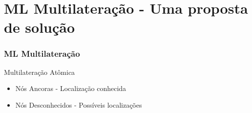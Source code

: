\documentclass{beamer}
\begin{document}
\section{ML Multilateração - Uma proposta de solução}
\begin{frame}
\frametitle{\normalsize ML Multilateração}
\begin{flushleft}
	Multilateração Atômica 
	\begin{itemize}
		\item Nós Ancoras - Localização conhecida
		\item Nós Desconhecidos - Possíveis localizações
	\end{itemize}
	
	\begin{figure}
	\end{figure}
	\vspace{0.4cm}
\end{flushleft}
\end{frame}
\end{document}
